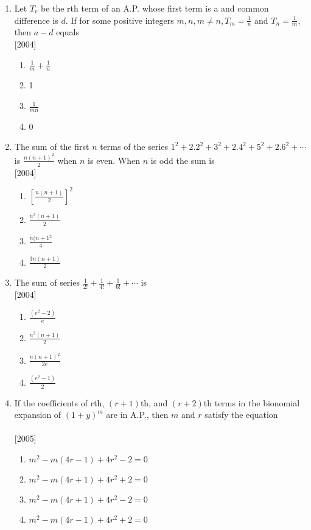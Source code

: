 \documentclass[journal,12pt,twocolumn]{IEEEtran}
\theoremstyle{remark}
\begin{document}
\begin{enumerate}[label={\arabic*.}]
\item {Let $T_r$ be the rth term of an A.P. whose first term is a and common difference is $d$. If for some positive integers $m,n, m\neq n, T_m = \frac{1}{n}$ and $T_n = \frac{1}{m}$, then $a-d$ equals}\\ \hfill{[2004]}
\begin{enumerate}[label={(\alph*)}]
\item  {$\frac{1}{m}+\frac{1}{n}$}
\item  {1}
\item  {$\frac{1}{mn}$}
\item  {0}
\end{enumerate}

\item {The sum of the first $n$ terms of the series $1^2+2.2^2+3^2+2.4^2+5^2+2.6^2+\cdots$ is $\frac{n(n+1)^2}{2}$ when $n$ is even. When $n$ is odd the sum is}\\ \hfill{[2004]}
\begin{enumerate}[label={(\alph*)}]
\item  {$\left[\frac{n(n+1)}{2}\right]^2$}
\item  {$\frac{n^2(n+1)}{2}$}
\item  {$\frac{n(n+1^2}{4}$}
\item  {$\frac{3n(n+1)}{2}$}
\end{enumerate}

\item {The sum of series $\frac{1}{2!}+\frac{1}{4!}+\frac{1}{6!}+\cdots$ is}\\ \hfill{[2004]}
\begin{enumerate}[label={(\alph*)}]
\item  {$\frac{(e^2-2)}{e}$}
\item  {$\frac{n^2(n+1)}{2}$}
\item  {$\frac{n(n+1)^2}{2e}$}
\item  {$\frac{(e^2-1)}{2}$}
\end{enumerate}

\item {If the coefficients of rth, $(r+1)$th, and $(r+2)$th terms in the bionomial expansion of $(1+y)^m$ are in A.P., then $m$ and $r$ satisfy the equation\\} \\ \hfill{[2005]}
\begin{enumerate}[label={(\alph*)}]
\item  {$m^2-m(4r-1)+4r^2-2=0$}
\item  {$m^2-m(4r+1)+4r^2+2=0$}
\item  {$m^2-m(4r+1)+4r^2-2=0$}
\item  {$m^2-m(4r-1)+4r^2+2=0$}
\end{enumerate}


\end{enumerate}
\end{document}
